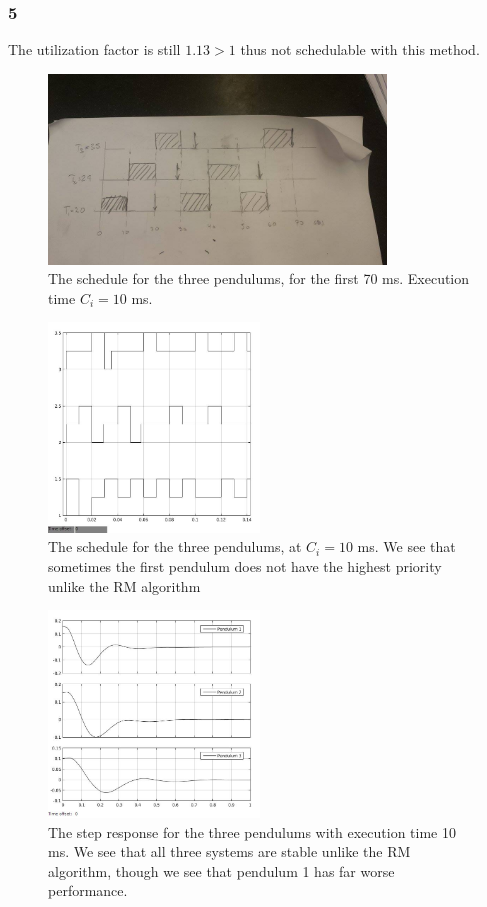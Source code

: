 \documentclass[10pt,a4paper]{article}
\begin{document}
\subsubsection*{5}
The utilization factor is still $1.13>1$ thus not schedulable with this method.
\begin{figure}[!h]
  \centering
    \includegraphics[width=0.8\textwidth]{egen2.jpg}
      \caption{The schedule for the three pendulums, for the first 70 ms. Execution time $C_i=10$ ms.}
\end{figure}
\begin{figure}[!h]
  \centering
    \includegraphics[width=0.5\textwidth]{schedual10msedf.jpg}
      \caption{The schedule for the three pendulums, at $C_i=10$ ms. We see that sometimes the first pendulum does not have the highest priority unlike the RM algorithm}
\end{figure}
\begin{figure}[!h]
  \centering
    \includegraphics[width=0.5\textwidth]{10msedf.jpg}
      \caption{The step response for the three pendulums with execution time 10 ms. We see that all three systems are stable unlike the RM algorithm, though we see that pendulum 1 has far worse performance.}
\end{figure}
\newpage
\end{document}
